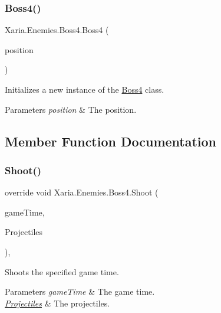 \subsubsection{\texorpdfstring{Boss4()}{Boss4()}}
{\footnotesize\ttfamily Xaria.\+Enemies.\+Boss4.\+Boss4 (\begin{DoxyParamCaption}\item[{Vector2}]{position }\end{DoxyParamCaption})\hspace{0.3cm}{\ttfamily [inline]}}



Initializes a new instance of the \hyperlink{classXaria_1_1Enemies_1_1Boss4}{Boss4} class. 


\begin{DoxyParams}{Parameters}
{\em position} & The position.\\
\hline
\end{DoxyParams}


\subsection{Member Function Documentation}
\mbox{\label{classXaria_1_1Enemies_1_1Boss4_a8f2416704b32c1ceedfa08b7e226924e}} 
\subsubsection{\texorpdfstring{Shoot()}{Shoot()}}
{\footnotesize\ttfamily override void Xaria.\+Enemies.\+Boss4.\+Shoot (\begin{DoxyParamCaption}\item[{Game\+Time}]{game\+Time,  }\item[{ref List$<$ \hyperlink{classXaria_1_1Projectile}{Projectile} $>$}]{Projectiles }\end{DoxyParamCaption})\hspace{0.3cm}{\ttfamily [inline]}, {\ttfamily [virtual]}}



Shoots the specified game time. 


\begin{DoxyParams}{Parameters}
{\em game\+Time} & The game time.\\
\hline
{\em \hyperlink{namespaceXaria_1_1Projectiles}{Projectiles}} & The projectiles.\\
\hline
\end{DoxyParams}


